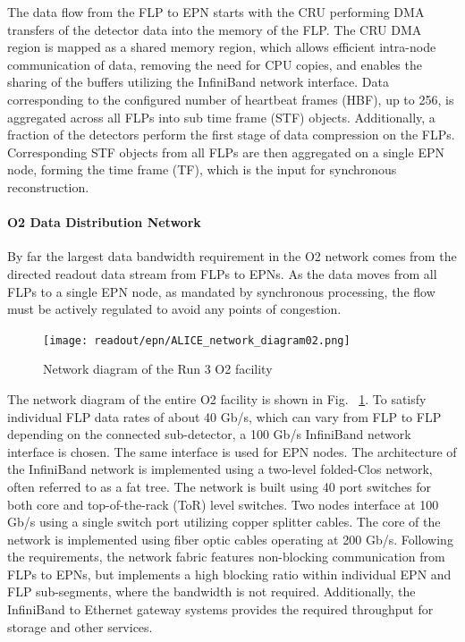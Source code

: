 The data flow from the FLP to EPN starts with the CRU performing DMA transfers of the detector data into the memory of the FLP. 
The CRU DMA region is mapped as a shared memory region, which allows efficient intra-node communication of data, removing the need for CPU copies, and enables the sharing of the buffers utilizing the InfiniBand network interface. 
Data corresponding to the configured number of heartbeat frames (HBF), up to 256, is aggregated across all FLPs into sub time frame (STF) objects. 
Additionally, a fraction of the detectors perform the first stage of data compression on the FLPs. 
Corresponding STF objects from all FLPs are then aggregated on a single EPN node, forming the time frame (TF), which is the input for synchronous reconstruction.

\paragraph{O2 Data Distribution Network}

By far the largest data bandwidth requirement in the O2 network comes from the directed readout data stream from FLPs to EPNs. 
As the data moves from all FLPs to a single EPN node, as mandated by synchronous processing, the flow must be actively regulated to avoid any points of congestion.

\begin{figure}[ht]
\centering
\texttt{[image: readout/epn/ALICE\_network\_diagram02.png]}
\caption{Network diagram of the Run 3 O2 facility}
\label{fig:alice_network}
\end{figure}

The network diagram of the entire O2 facility is shown in Fig. ~\ref{fig:alice_network}.
To satisfy individual FLP data rates of about 40 Gb/s, which can vary from FLP to FLP depending on the connected sub-detector, a 100 Gb/s InfiniBand network interface is chosen. 
The same interface is used for EPN nodes. 
The architecture of the InfiniBand network is implemented using a two-level folded-Clos network, often referred to as a fat tree. 
The network is built using 40 port switches for both core and top-of-the-rack (ToR) level switches. 
Two nodes interface at 100 Gb/s using a single switch port utilizing copper splitter cables. 
The core of the network is implemented using fiber optic cables operating at 200 Gb/s. 
Following the requirements, the network fabric features non-blocking communication from FLPs to EPNs, but implements a high blocking ratio within individual EPN and FLP sub-segments, where the bandwidth is not required. 
Additionally, the InfiniBand to Ethernet gateway systems provides the required throughput for storage and other services.

